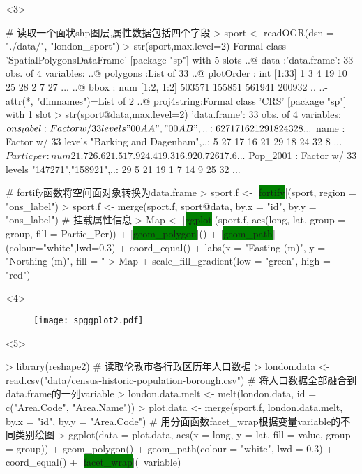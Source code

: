 \begin{frame}[t,fragile]{\subsecname}{\subsubsecname}
\begin{overlayarea}{\textwidth}{\textheight}
\begin{onlyenv}<3>
\begin{rcode}
# 读取一个面状shp图层,属性数据包括四个字段
> sport <- readOGR(dsn = "./data/", "london_sport")
> str(sport,max.level=2)
Formal class 'SpatialPolygonsDataFrame' [package "sp"] with 5 slots
  ..@ data       :'data.frame': 33 obs. of  4 variables:
  ..@ polygons   :List of 33
  ..@ plotOrder  : int [1:33] 1 3 4 19 10 25 28 2 7 27 ...
  ..@ bbox       : num [1:2, 1:2] 503571 155851 561941 200932
  .. ..- attr(*, "dimnames")=List of 2
  ..@ proj4string:Formal class 'CRS' [package "sp"] with 1 slot  
> str(sport@data,max.level=2)
'data.frame':   33 obs. of  4 variables:
 $ ons_label : Factor w/ 33 levels "00AA","00AB",..: 6 27 17 16 21 29 18 24 32 8 ...
 $ name      : Factor w/ 33 levels "Barking and Dagenham",..: 5 27 17 16 21 29 18 24 32 8 ...
 $ Partic_Per: num  21.7 26.6 21.5 17.9 24.4 19.3 16.9 20.7 26 17.6 ...
 $ Pop_2001  : Factor w/ 33 levels "147271","158921",..: 29 5 21 19 1 7 14 9 25 32 ...

# fortify函数将空间面对象转换为data.frame
> sport.f <- |\colorbox{green}{fortify}|(sport, region = "ons_label")
> sport.f <- merge(sport.f, sport@data, by.x = "id", by.y = "ons_label") # 挂载属性信息
> Map <- |\colorbox{green}{ggplot}|(sport.f, aes(long, lat, group = group, fill = Partic_Per)) + |\colorbox{green}{geom\_polygon}|() + |\colorbox{green}{geom\_path}|(colour="white",lwd=0.3) + coord_equal() + labs(x = "Easting (m)", y = "Northing (m)", fill = "%
> Map + scale_fill_gradient(low = "green", high = "red")
\end{rcode}
\end{onlyenv}

\begin{onlyenv}<4>
\begin{figure}[ht] \vspace{-20pt}
  \centering 
  \texttt{[image: spggplot2.pdf]}
\end{figure}
\end{onlyenv}

\begin{onlyenv}<5>
\begin{rcode}
> library(reshape2)
# 读取伦敦市各行政区历年人口数据
> london.data <- read.csv("data/census-historic-population-borough.csv")
# 将人口数据全部融合到data.frame的一列variable
> london.data.melt <- melt(london.data, id = c("Area.Code", "Area.Name"))
> plot.data <- merge(sport.f, london.data.melt, by.x = "id", by.y = "Area.Code")
# 用分面函数facet\_wrap根据变量variable的不同类别绘图
> ggplot(data = plot.data, aes(x = long, y = lat, fill = value, group = group)) + 
         geom_polygon() + 
         geom_path(colour = "white", lwd = 0.3) + 
         coord_equal() + 
        |\colorbox{green}{facet\_wrap}|(~variable)
\end{rcode}
\end{onlyenv}


\end{overlayarea}
\end{frame}
